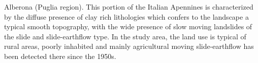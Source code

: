 %
Alberona (Puglia region). This portion of the Italian Apennines
is characterized by the diffuse presence of clay rich lithologies
which confers to the landscape a typical smooth topography,
with the wide presence of slow moving landslides of the slide
and slide-earthflow type. In the study area, the land use is
typical of rural areas, poorly inhabited and mainly agricultural
moving slide-earthflow has been detected there since the 1950s. 
%
%
